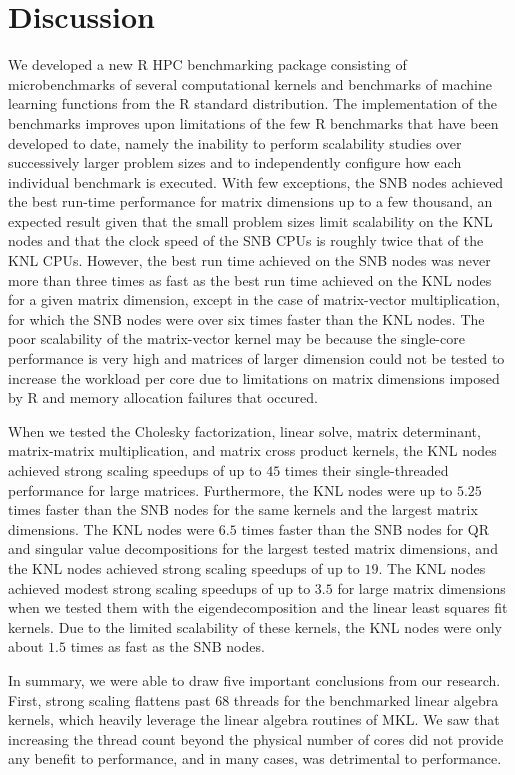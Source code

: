 \section{Discussion} \label{sec:discuss}
We developed a new R HPC benchmarking package consisting of microbenchmarks of
  several computational kernels and benchmarks of machine learning functions
  from the R standard distribution.
The implementation of the benchmarks improves upon limitations of the few R
  benchmarks that have been developed to date, namely the inability to perform
  scalability studies over successively larger problem sizes and to
  independently configure how each individual benchmark is executed.
With few exceptions, the SNB nodes achieved the best run-time
  performance for matrix dimensions up to a few thousand, an expected result
  given that the small problem sizes limit scalability on the KNL nodes
  and that the clock speed of the SNB CPUs is roughly twice that of
  the KNL CPUs.
However, the best run time achieved on the SNB nodes was never more
  than three times as fast as the best run time achieved on the KNL
  nodes for a given matrix dimension, except in the case of matrix-vector
  multiplication, for which the SNB nodes were over six times faster
  than the KNL nodes.
The poor scalability of the matrix-vector kernel may be because the single-core
  performance is very high and matrices of larger dimension could not be
  tested to increase the workload per core due to limitations on matrix dimensions
  imposed by R and memory allocation failures that occured.

When we tested the Cholesky factorization, linear solve, matrix
  determinant, matrix-matrix multiplication, and matrix cross product kernels,
  the KNL nodes achieved strong scaling speedups of up to $45$ times
  their single-threaded performance for large matrices.
Furthermore, the KNL nodes were up to $5.25$ times faster than the SNB nodes
  for the same kernels and the largest matrix dimensions.
The KNL nodes were $6.5$ times faster than the SNB nodes for QR and singular
  value decompositions for the largest tested matrix dimensions, and the KNL
  nodes achieved strong scaling speedups of up to $19$.
The KNL nodes achieved modest strong scaling speedups of up to $3.5$
  for large matrix dimensions when we tested them with the eigendecomposition
  and the linear least squares fit kernels.
Due to the limited scalability of these kernels, the KNL nodes were only about
  $1.5$ times as fast as the SNB nodes.

In summary, we were able to draw five important conclusions from our research.
First, strong scaling flattens past 68 threads for the benchmarked
  linear algebra kernels, which heavily leverage the linear algebra routines
  of MKL.
We saw that increasing the thread count beyond the physical number of cores
  did not provide any benefit to performance, and in many cases, was
  detrimental to performance.

